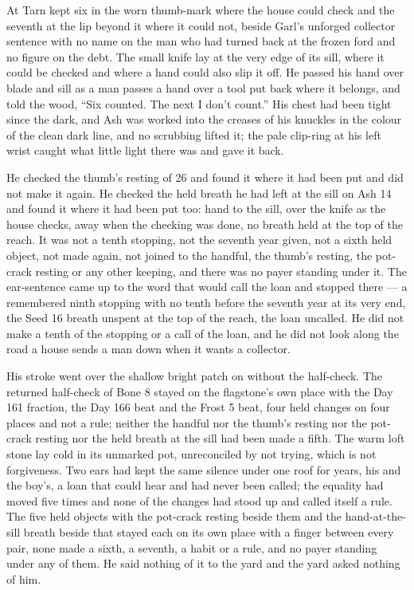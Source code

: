 \scenebreak

At  Tarn kept six in the worn thumb-mark where the house could check and the seventh at the lip beyond it where it could not, beside Garl’s unforged collector sentence with no name on the man who had turned back at the frozen ford and no figure on the debt. The small knife lay at the very edge of its sill, where it could be checked and where a hand could also slip it off. He passed his hand over blade and sill as a man passes a hand over a tool put back where it belongs, and told the wood, “Six counted. The next I don’t count.” His chest had been tight since the dark, and Ash was worked into the creases of his knuckles in the colour of the clean dark line, and no scrubbing lifted it; the pale clip-ring at his left wrist caught what little light there was and gave it back.

He checked the thumb’s resting of  26 and found it where it had been put and did not make it again. He checked the held breath he had left at the sill on Ash 14 and found it where it had been put too: hand to the sill, over the knife as the house checks, away when the checking was done, no breath held at the top of the reach. It was not a tenth stopping, not the seventh year given, not a sixth held object, not made again, not joined to the handful, the thumb’s resting, the pot-crack resting or any other keeping, and there was no payer standing under it. The ear-sentence came up to the word that would call the loan and stopped there --- a remembered ninth stopping with no tenth before the seventh year at its very end, the Seed 16 breath unspent at the top of the reach, the loan uncalled. He did not make a tenth of the stopping or a call of the loan, and he did not look along the road a house sends a man down when it wants a collector.

His stroke went over the shallow bright patch on  without the half-check. The returned half-check of Bone 8 stayed on the flagstone’s own place with the Day 161 fraction, the Day 166 beat and the Frost 5 beat, four held changes on four places and not a rule; neither the handful nor the thumb’s resting nor the pot-crack resting nor the held breath at the sill had been made a fifth. The warm loft stone lay cold in its unmarked pot, unreconciled by not trying, which is not forgiveness. Two ears had kept the same silence under one roof for years, his and the boy’s, a loan that could hear and had never been called; the equality had moved five times and none of the changes had stood up and called itself a rule. The five held objects with the pot-crack resting beside them and the hand-at-the-sill breath beside that stayed each on its own place with a finger between every pair, none made a sixth, a seventh, a habit or a rule, and no payer standing under any of them. He said nothing of it to the yard and the yard asked nothing of him.


